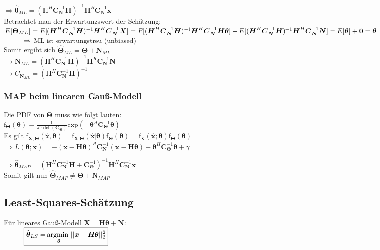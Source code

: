 \documentclass[a4paper,landscape,6pt]{article}
\newcommand{\ma}[1]{\ensuremath{\boldsymbol {#1}}}								%
\renewcommand{\vec}[1]{\ensuremath{\boldsymbol {#1}}}							%
\begin{document}
\begin{multicols}{3}
$\Rightarrow \hat{\vec \theta}_{ML} = (\ma H^H\ma C_{\vec N}^{-1} \ma H)^{-1}\ma H^H \ma C_{\vec N}^{-1} \vec x$\\

Betrachtet man der Erwartungswert der Schätzung:\\
$E[\vec \Theta_{ML}] = E[(\ma H^H\ma C_{\vec N}^{-1} \ma H)^{-1}\ma H^H \ma C_{\vec N}^{-1} \vec X]\\
= E[(\ma H^H\ma C_{\vec N}^{-1} \ma H)^{-1}\ma H^H \ma C_{\vec N}^{-1} \ma H \vec \theta] \\ + E[(\ma H^H\ma C_{\vec N}^{-1} \ma H)^{-1}\ma H^H \ma C_{\vec N}^{-1} \vec N] = E[\vec \theta] + \vec 0 = \vec \theta$\\
$\hspace*{1cm} \Rightarrow $ ML ist erwartungstreu (unbiased)\\
Somit ergibt sich $\hat{\vec \Theta}_{ML} = \vec \Theta + \vec N_{ML}$\\
$\rightarrow \vec N_{ML} = (\ma H^H\ma C_{\vec N}^{-1} \ma H)^{-1}\ma H^H \ma C_{\vec N}^{-1} \vec N$\\ 
$\rightarrow  C_{\vec N_{ML}} = (\ma H^H\ma C_{\vec N}^{-1} \ma H)^{-1}$
\subsubsection*{MAP beim linearen Gauß-Modell}
Die PDF von $\vec \Theta$ muss wie folgt lauten:\\
$\text{f}_{\vec \Theta}(\vec \theta) = \frac{1}{\pi^n \det(\ma C_{\vec \Theta})} \text{exp}(-\vec \theta^H \ma C_{\vec \Theta}^{-1} \vec \theta)$\\
Es gilt $\text{f}_{\vec X,\vec \Theta}(\hat{\vec x}, \vec \theta) = \text{f}_{\vec X|\vec \Theta}(\hat{\vec x} | \vec \theta) \text{f}_{\vec \Theta}(\vec \theta) = \text{f}_{\vec X}(\hat{\vec x}; \vec \theta) \text{f}_{\vec \Theta}(\vec \theta) $\\

$\Rightarrow L(\vec \theta; \vec x) = -(\vec x - \ma H \vec \theta)^H \ma C_{\vec N}^{-1} (\vec x - \ma H \vec \theta) -\vec \theta^H \ma C_{\vec \Theta}^{-1} \vec \theta + \gamma$

$\Rightarrow \hat{\vec \theta}_{MAP} = (\ma H^H\ma C_{\vec N}^{-1} \ma H + \ma C_{\vec \Theta}^{-1})^{-1}\ma H^H \ma C_{\vec N}^{-1} \vec x$\\

Somit gilt nun $\hat{\vec \Theta}_{MAP} \neq \vec \Theta + \vec N_{MAP}$
\subsection*{Least-Squares-Schätzung}
Für lineares Gauß-Modell $\vec X = \ma H \vec \theta + \vec N$:\\
$\tab \boxed{\hat{\vec \theta}_{LS} = \underset{\vec \theta}{\text{argmin }} ||\vec x - \ma H \vec \theta||_2^2}$\\
	

\end{multicols}
\end{document}
